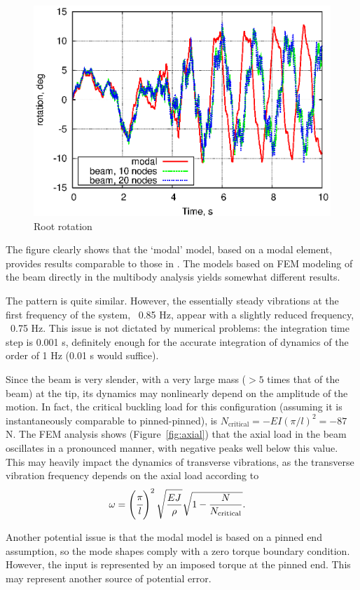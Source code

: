 \documentclass[11pt, a4paper, subeqn]{article}
\begin{document}
\begin{figure}
\centering
\includegraphics[width=.8\textwidth]{root-a.eps}
\caption{Root rotation}
\label{fig:root-a}
\end{figure}

The figure clearly shows that the `modal' model, based on a modal element,
provides results comparable to those in \cite{MACLEAN-2007}.
The models based on FEM modeling of the beam directly in the multibody
analysis yields somewhat different results.

The pattern is quite similar.  However, the essentially steady vibrations
at the first frequency of the system, ~0.85 Hz, appear with a slightly
reduced frequency, ~0.75 Hz.
This issue is not dictated by numerical problems: the integration time step
is 0.001 s, definitely enough for the accurate integration of dynamics
of the order of 1 Hz (0.01 s would suffice).

Since the beam is very slender, with a very large mass
($> 5$ times that of the beam) at the tip, its dynamics may nonlinearly depend
on the amplitude of the motion.
In fact, the critical buckling load for this configuration
(assuming it is instantaneously comparable to pinned-pinned),
is $N_\text{critical}=-EI(\pi/l)^2 = -87$ N.
The FEM analysis shows (Figure~\ref{fig:axial})
that the axial load in the beam oscillates in a pronounced manner,
with negative peaks well below this value.
This may heavily impact the dynamics of transverse vibrations,
as the transverse vibration frequency depends on the axial load
according to
\begin{align}
	\omega
	&=
	\left( \cfrac{\pi}{l} \right)^2 \sqrt{\frac{EJ}{\rho}}
		\sqrt{1 - \frac{N}{N_{\text{critical}}}}
	.
\end{align}

Another potential issue is that the modal model is based on a pinned
end assumption, so the mode shapes comply with a zero torque
boundary condition.
However, the input is represented by an imposed torque at the pinned end.
This may represent another source of potential error.
\end{document}

